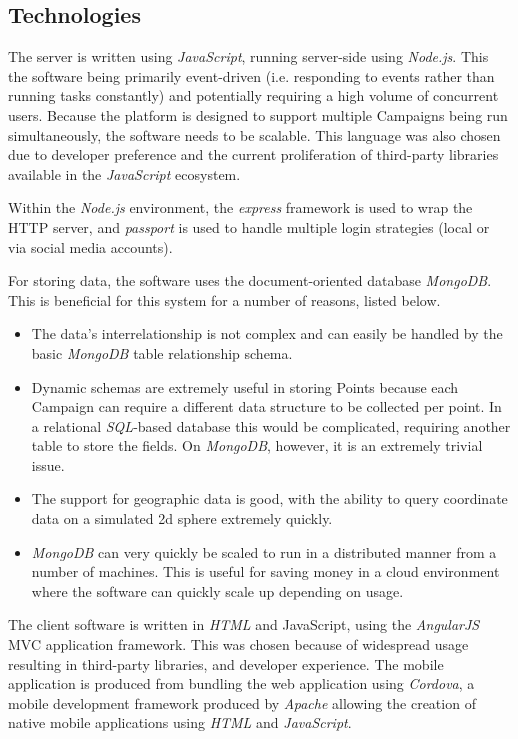 \documentclass{article}
\begin{document}
		\subsection{Technologies}

		The server is written using \emph{JavaScript}, running server-side using \emph{Node.js}. This the software being primarily event-driven (i.e. responding to events rather than running tasks constantly) and potentially requiring a high volume of concurrent users\cite{tilkov_node.js:_2010}. Because the platform is designed to support multiple Campaigns being run simultaneously, the software needs to be scalable. This language was also chosen due to developer preference and the current proliferation of third-party libraries available in the \emph{JavaScript} ecosystem.

		Within the \emph{Node.js} environment, the \emph{express} framework is used to wrap the HTTP server, and \emph{passport} is used to handle multiple login strategies (local or via social media accounts).

		For storing data, the software uses the document-oriented database \emph{MongoDB}. This is beneficial for this system for a number of reasons, listed below.

		\begin{itemize}
			\item The data's interrelationship is not complex and can easily be handled by the basic \emph{MongoDB} table relationship schema.
			\item Dynamic schemas are extremely useful in storing Points because each Campaign can require a different data structure to be collected per point. In a relational \emph{SQL}-based database this would be complicated, requiring another table to store the fields. On \emph{MongoDB}, however, it is an extremely trivial issue.
			\item The support for geographic data is good, with the ability to query coordinate data on a simulated 2d sphere extremely quickly.
			\item \emph{MongoDB} can very quickly be scaled to run in a distributed manner from a number of machines. This is useful for saving money in a cloud environment where the software can quickly scale up depending on usage.
		\end{itemize}

		The client software is written in \emph{HTML} and JavaScript, using the \emph{AngularJS} MVC application framework. This was chosen because of widespread usage resulting in third-party libraries, and developer experience. The mobile application is produced from bundling the web application using \emph{Cordova}, a mobile development framework produced by \emph{Apache} allowing the creation of native mobile applications using \emph{HTML} and \emph{JavaScript}.
\end{document}
